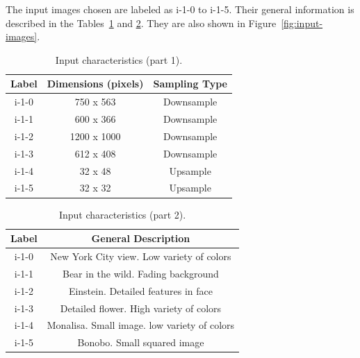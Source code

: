 \documentclass[]{IEEEtran}
\begin{document}
The input images chosen are labeled as i-1-0 to i-1-5. Their general information is described in the Tables~\ref{table:inputs-1} and \ref{table:inputs-2}. They are also shown in Figure~\ref{fig:input-images}.

\begin{table}[H]
\centering
\begin{tabular}{ |c|c|c| } 
 \hline
 Label & Dimensions (pixels) & Sampling Type\\
 \hline
 i-1-0 & 750 x 563 & Downsample\\  
 \hline
 i-1-1 & 600 x 366 & Downsample\\
 \hline
 i-1-2 & 1200 x 1000 & Downsample\\
 \hline
 i-1-3 & 612 x 408 & Downsample\\
 \hline
 i-1-4 & 32 x 48 & Upsample \\
 \hline
 i-1-5 & 32 x 32 & Upsample\\
 \hline
\end{tabular}
 \label{table:inputs-1}
 \caption{Input characteristics (part 1).}
\end{table}

\begin{table}[H]
\centering
\begin{tabular}{ |c|c| } 
 \hline
 Label & General Description\\
 \hline
 i-1-0 & New York City view. Low variety of colors\\  
 \hline
 i-1-1 & Bear in the wild. Fading background\\
 \hline
 i-1-2 & Einstein. Detailed features in face \\
 \hline
 i-1-3 & Detailed flower. High variety of colors \\
 \hline
 i-1-4 & Monalisa. Small image. low variety of colors \\
 \hline
 i-1-5 & Bonobo. Small squared image \\
 \hline
\end{tabular}
 \label{table:inputs-2}
 \caption{Input characteristics (part 2).}
\end{table}

\end{document}
